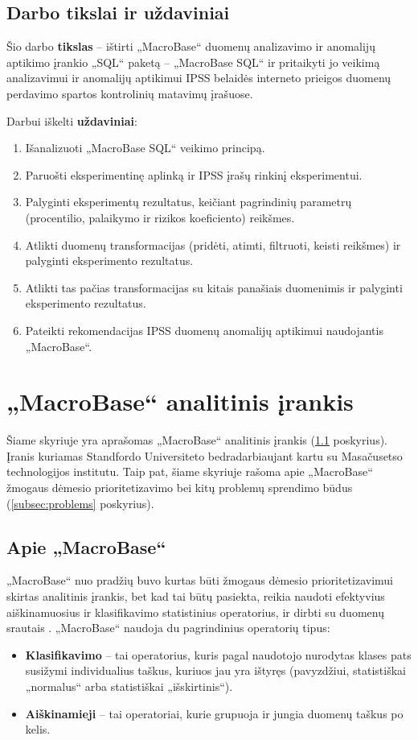 \documentclass{VUMIFPSbakalaurinis}
\begin{document}
\subsection{Darbo tikslai ir uždaviniai}
Šio darbo \textbf{tikslas} – ištirti „MacroBase“ duomenų analizavimo ir anomalijų aptikimo įrankio „SQL“ paketą – „MacroBase SQL“ ir pritaikyti jo veikimą analizavimui ir anomalijų aptikimui IPSS belaidės interneto prieigos duomenų perdavimo spartos kontrolinių matavimų įrašuose.\par

Darbui iškelti \textbf{uždaviniai}:
\begin{enumerate}
	\item Išanalizuoti „MacroBase SQL“ veikimo principą.
	\item Paruošti eksperimentinę aplinką ir IPSS įrašų rinkinį eksperimentui.
	\item Palyginti eksperimentų rezultatus, keičiant pagrindinių parametrų (procentilio, palaikymo ir rizikos koeficiento) reikšmes.
	\item Atlikti duomenų transformacijas (pridėti, atimti, filtruoti, keisti reikšmes) ir palyginti eksperimento rezultatus.
	\item Atlikti tas pačias transformacijas su kitais panašiais duomenimis ir palyginti eksperimento rezultatus. 
	\item Pateikti rekomendacijas IPSS duomenų anomalijų aptikimui naudojantis „MacroBase“.
\end{enumerate}

\section{„MacroBase“ analitinis įrankis} \label{sec:macrobase}
Šiame skyriuje yra aprašomas „MacroBase“ analitinis įrankis (\ref{subsec:about} poskyrius). Įranis kuriamas Standfordo Universiteto bedradarbiaujant kartu su Masačusetso technologijos institutu. Taip pat, šiame skyriuje rašoma apie „MacroBase“ žmogaus dėmesio prioritetizavimo bei kitų problemų sprendimo būdus (\ref{subsec:problems} poskyrius). 

\subsection{Apie „MacroBase“} \label{subsec:about}
„MacroBase“ nuo pradžių buvo kurtas būti žmogaus dėmesio prioritetizavimui skirtas analitinis įrankis, bet kad tai būtų pasiekta, reikia naudoti efektyvius aiškinamuosius ir klasifikavimo  statistinius operatorius, ir dirbti su duomenų srautais \cite{talk}. „MacroBase“ naudoja du pagrindinius operatorių tipus:
\begin{itemize}
	\item \textbf{Klasifikavimo} – tai operatorius, kuris pagal naudotojo nurodytas klases pats susižymi individualius taškus, kuriuos jau yra ištyręs (pavyzdžiui, statistiškai „normalus“ arba statistiškai „išskirtinis“).
	\item \textbf{Aiškinamieji} – tai operatoriai, kurie grupuoja ir jungia duomenų taškus po kelis.
\end{itemize}
\end{document}
